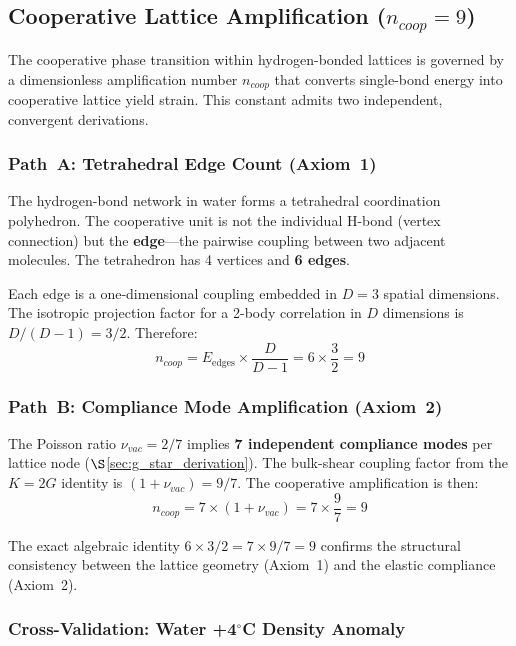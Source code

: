 \subsection{Cooperative Lattice Amplification ($n_{coop} = 9$)}
\label{sec:n_coop_derivation}

The cooperative phase transition within hydrogen-bonded lattices is governed by a dimensionless amplification number $n_{coop}$ that converts single-bond energy into cooperative lattice yield strain. This constant admits two independent, convergent derivations.

\subsubsection*{Path~A: Tetrahedral Edge Count (Axiom~1)}

The hydrogen-bond network in water forms a tetrahedral coordination polyhedron. The cooperative unit is not the individual H-bond (vertex connection) but the \textbf{edge}---the pairwise coupling between two adjacent molecules. The tetrahedron has 4 vertices and \textbf{6 edges}.

Each edge is a one-dimensional coupling embedded in $D = 3$ spatial dimensions. The isotropic projection factor for a 2-body correlation in $D$ dimensions is $D/(D-1) = 3/2$. Therefore:
\begin{equation}
    n_{coop} = E_{\text{edges}} \times \frac{D}{D-1} = 6 \times \frac{3}{2} = 9
\end{equation}

\subsubsection*{Path~B: Compliance Mode Amplification (Axiom~2)}

The Poisson ratio $\nu_{vac} = 2/7$ implies \textbf{7 independent compliance modes} per lattice node ($\S$\ref{sec:g_star_derivation}). The bulk-shear coupling factor from the $K = 2G$ identity is $(1 + \nu_{vac}) = 9/7$. The cooperative amplification is then:
\begin{equation}
    n_{coop} = 7 \times (1 + \nu_{vac}) = 7 \times \frac{9}{7} = 9
\end{equation}

The exact algebraic identity $6 \times 3/2 = 7 \times 9/7 = 9$ confirms the structural consistency between the lattice geometry (Axiom~1) and the elastic compliance (Axiom~2).

\subsubsection*{Cross-Validation: Water +4$^\circ$C Density Anomaly}

